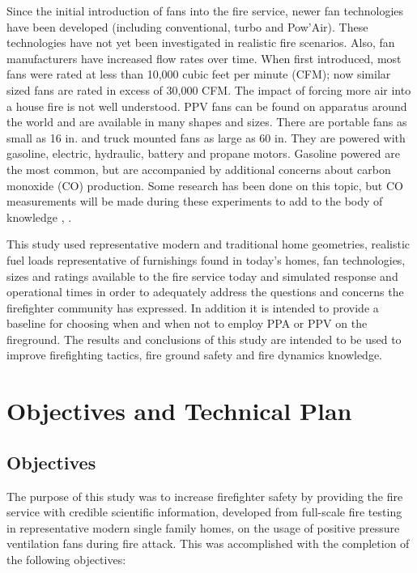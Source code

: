 \documentclass{article}
\begin{document}
Since the initial introduction of fans into the fire service, newer fan technologies have been developed (including conventional, turbo and Pow’Air). These technologies have not yet been investigated in realistic fire scenarios. Also, fan manufacturers have increased flow rates over time. When first introduced, most fans were rated at less than 10,000 cubic feet per minute (CFM); now similar sized fans are rated in excess of 30,000 CFM. The impact of forcing more air into a house fire is not well understood. PPV fans can be found on apparatus around the world and are available in many shapes and sizes. There are portable fans as small as 16 in. and truck mounted fans as large as 60 in. They are powered with gasoline, electric, hydraulic, battery and propane motors. Gasoline powered are the most common, but are accompanied by additional concerns about carbon monoxide (CO) production. Some research has been done on this topic, but CO measurements will be made during these experiments to add to the body of knowledge \cite{KerberMadrzyPPVInLargeStructures}, \cite{LougheedPPVHighRise}. 

This study used representative modern and traditional home geometries, realistic fuel loads representative of furnishings found in today’s homes, fan technologies, sizes and ratings available to the fire service today and simulated response and operational times in order to adequately address the questions and concerns the firefighter community has expressed. In addition it is intended to provide a baseline for choosing when and when not to employ PPA or PPV on the fireground. The results and conclusions of this study are intended to be used to improve firefighting tactics, fire ground safety and fire dynamics knowledge.

\clearpage

\section{Objectives and Technical Plan}

\subsection {Objectives}

The purpose of this study was to increase firefighter safety by providing the fire service with credible scientific information, developed from full-scale fire testing in representative modern single family homes, on the usage of positive pressure ventilation fans during fire attack. This was accomplished with the completion of the following objectives:
\end{document}
